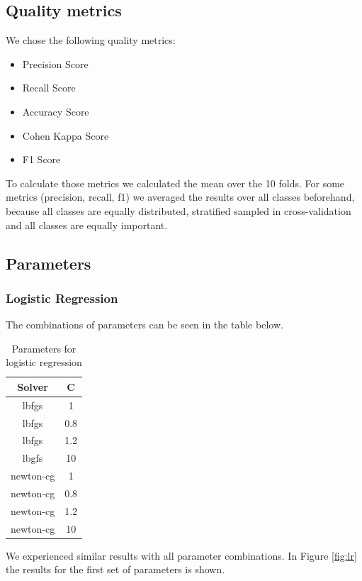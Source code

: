\documentclass{sig-alternate-05-2015}
\begin{document}
\subsection{Quality metrics}

We chose the following quality metrics:
\begin{itemize}
	\item Precision Score
	\item Recall Score
	\item Accuracy Score
	\item Cohen Kappa Score
	\item F1 Score
\end{itemize}

To calculate those metrics we calculated the mean over the 10 folds.
For some metrics (precision, recall, f1) we averaged the results over all classes beforehand, because all classes are equally distributed, stratified sampled in cross-validation and all classes are equally important.

\subsection{Parameters}

\subsubsection{Logistic Regression}
The combinations of parameters can be seen in the table below.

\begin{table}[h]
\label{tbl:1}
\centering
\caption{Parameters for logistic regression}
\begin{tabular}{|c|c|}
\hline 
Solver & C \\ 
\hline 
lbfgs & 1 \\ 
\hline 
lbfgs & 0.8 \\ 
\hline 
lbfgs & 1.2 \\ 
\hline 
lbgfs & 10 \\ 
\hline 
newton-cg & 1 \\ 
\hline 
newton-cg & 0.8 \\ 
\hline 
newton-cg & 1.2 \\ 
\hline 
newton-cg & 10 \\ 
\hline 
\end{tabular} 
\end{table}

We experienced similar results with all parameter combinations.
In Figure \ref{fig:lr} the results for the first set of parameters is shown.
\end{document}
